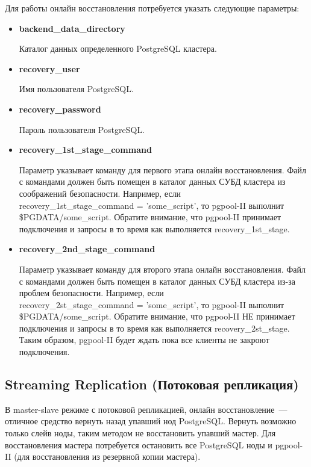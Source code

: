 Для работы онлайн восстановления потребуется указать следующие параметры:
\begin{itemize}
\item \textbf{backend\_data\_directory}

Каталог данных определенного PostgreSQL кластера.

\item \textbf{recovery\_user}

Имя пользователя PostgreSQL.

\item \textbf{recovery\_password}

Пароль пользователя PostgreSQL.

\item \textbf{recovery\_1st\_stage\_command}

Параметр указывает команду для первого этапа онлайн восстановления.
Файл с командами должен быть помещен в каталог данных СУБД кластера из соображений безопасности.
Например, если \\recovery\_1st\_stage\_command = 'some\_script',
то pgpool-II выполнит \$PGDATA/some\_script.
Обратите внимание, что pgpool-II принимает подключения и запросы в то время как выполняется recovery\_1st\_stage.

\item \textbf{recovery\_2nd\_stage\_command}

Параметр указывает команду для второго этапа онлайн восстановления.
Файл с командами должен быть помещен в каталог данных СУБД кластера из-за проблем безопасности.
Например, если \\recovery\_2st\_stage\_command = 'some\_script',
то pgpool-II выполнит \$PGDATA/some\_script.
Обратите внимание, что pgpool-II НЕ принимает подключения и запросы в то время как выполняется recovery\_2st\_stage.
Таким образом, pgpool-II будет ждать пока все клиенты не закроют подключения.

\end{itemize}


\subsection{Streaming Replication (Потоковая репликация)}
В master-slave режиме с потоковой репликацией, онлайн восстановление~--- отличное средство вернуть назад упавший нод PostgreSQL.
Вернуть возможно только слейв ноды, таким методом не восстановить упавший мастер. Для восстановления мастера потребуется остановить
все PostgreSQL ноды и pgpool-II (для восстановления из резервной копии мастера).

